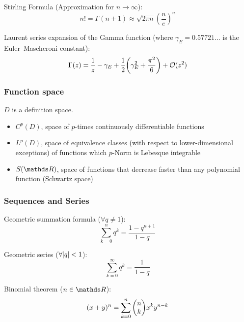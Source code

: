 			\noindent
			Stirling Formula (Approximation for $n \to\infty$):
			\begin{equation}
				n! = \Gamma(n+1) \approx \sqrt{2\pi n} \left( \frac{n}{e} \right)^{n}
			\end{equation}

			\noindent
			Laurent series expansion of the Gamma function (where $\gamma_E=0.57721\dots$ is the Euler--Mascheroni constant):
			\begin{equation}
				\Gamma(z) = \frac{1}{z} - \gamma_E + \frac{1}{2}\qty(\gamma_E^2 + \frac{\pi^2}{6}) +\mathcal{O}(z^2)
			\end{equation}


		\subsubsection{Function space}
			\noindent
			$D$ is a definition space.
			\begin{itemize}
				\item $C^p(D)$, space of $p$-times continuously differentiable functions
				\item $L^p(D)$, space of equivalence classes (with respect to lower-dimensional exceptions) of functions which $p$-Norm is Lebesque integrable
				\item $S(\reals )$, space of functions that decrease faster than any polynomial function (Schwartz space)
			\end{itemize}

		\subsubsection{Sequences and Series}
			\noindent
			Geometric summation formula ($\forall q \ne 1$):
			\begin{equation}
				\sum_{k=0}^n q^k=\frac{1-q^{n+1}}{1-q}
			\end{equation}

			\noindent
			Geometric series ($\forall \abs{q} < 1$):
			\begin{equation}
				\sum_{k=0}^\infty q^k= \frac{1}{1-q}
			\end{equation}

			\noindent
			Binomial theorem ($n\in\reals $):
			\begin{equation}
				(x+y)^n=\sum_{k=0}^{n}\binomkoeff{n}{k}x^k y^{n-k}
			\end{equation}

